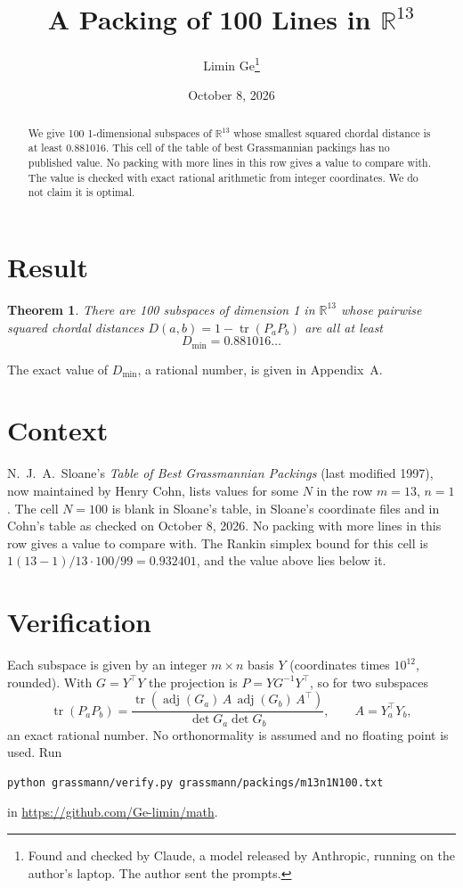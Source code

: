 \documentclass[11pt,a4paper]{article}
\title{A Packing of 100 Lines in $\mathbb{R}^{13}$}
\author{Limin Ge\thanks{Found and checked by Claude, a model released by Anthropic, running on the author's laptop. The author sent the prompts.}}
\date{October 8, 2026}
\newtheorem*{theorem}{Theorem}
\begin{document}
\maketitle
\begin{abstract}
We give 100 1-dimensional subspaces of $\mathbb{R}^{13}$ whose smallest squared chordal distance is at least 0.881016. This cell of the table of best Grassmannian packings has no published value. No packing with more lines in this row gives a value to compare with. The value is checked with exact rational arithmetic from integer coordinates. We do not claim it is optimal.
\end{abstract}

\section{Result}
\begin{theorem}
There are 100 subspaces of dimension 1 in $\mathbb{R}^{13}$ whose pairwise squared chordal distances $D(a,b) = 1 - \operatorname{tr}(P_aP_b)$ are all at least
\[ D_{\min} = 0.881016\ldots \]
\end{theorem}
The exact value of $D_{\min}$, a rational number, is given in Appendix~A.


\section{Context}
N.~J.~A.~Sloane's \emph{Table of Best Grassmannian Packings} (last modified 1997), now maintained by Henry Cohn, lists values for some $N$ in the row $m=13$, $n=1$. The cell $N=100$ is blank in Sloane's table, in Sloane's coordinate files and in Cohn's table as checked on October 8, 2026. No packing with more lines in this row gives a value to compare with. The Rankin simplex bound for this cell is $1(13-1)/13\cdot 100/99 = 0.932401$, and the value above lies below it.


\section{Verification}
Each subspace is given by an integer $m\times n$ basis $Y$ (coordinates times $10^{12}$, rounded). With $G=Y^\top Y$ the projection is $P=YG^{-1}Y^\top$, so for two subspaces
\[ \operatorname{tr}(P_aP_b)=\frac{\operatorname{tr}(\operatorname{adj}(G_a)\,A\,\operatorname{adj}(G_b)\,A^\top)}{\det G_a\det G_b},\qquad A=Y_a^\top Y_b, \]
an exact rational number. No orthonormality is assumed and no floating point is used. Run
\begin{verbatim}
python grassmann/verify.py grassmann/packings/m13n1N100.txt
\end{verbatim}
in \url{https://github.com/Ge-limin/math}.
\end{document}
